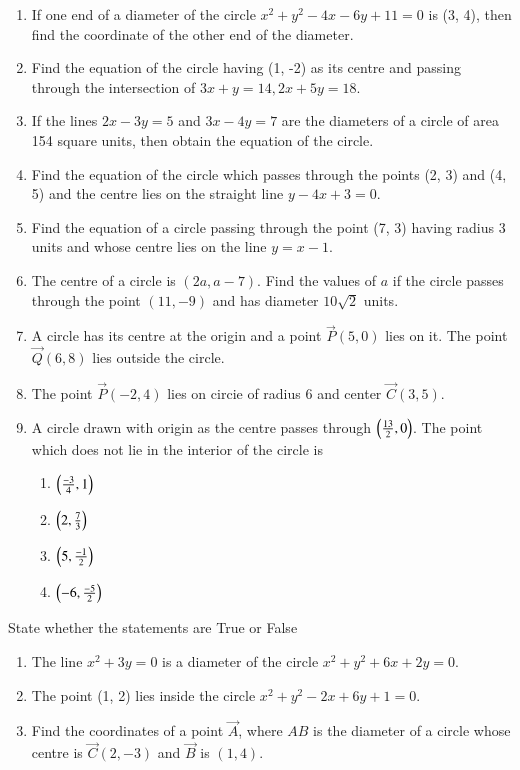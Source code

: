 \begin{enumerate}[label=\thesubsection.\arabic*, ref=\thesubsection.\theenumi, resume*]
 \item If one end of a diameter of the circle $x^2+y^2-4x-6y+11 =0$ is (3, 4),  then find the coordinate of the other end of the diameter.
 \item Find the equation of the circle having (1, -2) as its centre  and passing through the intersection of $3x+y=14,  2x+5y=18$.
\item If the lines $2x-3y=5$ and $3x-4y=7$ are the diameters of a circle of area 154 square units,  then obtain the equation of the circle.
\item Find the equation of the circle which passes through the points (2, 3) and (4, 5) and the centre lies on the straight line $y-4x+3=0$.
\item Find the equation of a circle passing through the point (7, 3) having radius 3 units and whose centre lies on the line $y=x-1$.
\item The centre of a circle is $(2a,  a-7)$. Find the values of $a$ if the circle passes through the point $(11,  -9)$ and has diameter $10\sqrt{2}$ units.
\item A circle has its centre at the origin and a point $\vec{P}(5,  0)$ lies on it. The point $\vec{Q}(6,  8)$ lies outside the circle.
 \item The point $\vec{P}(-2,  4)$ lies on circie of radius 6 and center $\vec{C}(3,  5)$.
\item A circle drawn with origin as the
centre passes through 
		$\left(\frac{13}{2},  0\right)$. The
point which does not lie in the
interior of the circle is
\begin{enumerate}
\item $\left(\frac{-3}{4},  1\right)$
\item $\left(2,  \frac{7}{3}\right)$
\item $\left(5,  \frac{-1}{2}\right)$
\item $\left(-6,  \frac{-5}{2}\right)$
\end{enumerate}
\end{enumerate}
State whether the statements are True or False 
\begin{enumerate}[label=\thesubsection.\arabic*, ref=\thesubsection.\theenumi, resume*]
\item The line $x^2+3y=0$ is a diameter of the circle $x^2+y^2+6x+2y=0$.
\item The point (1, 2) lies inside the circle $x^2+y^2-2x+6y+1=0$.
\item Find the coordinates of a point $\vec{A}$, where $AB$ is the diameter of a circle whose centre is $ \vec{C}(2,-3)$  and  $\vec{B}$ is $(1,4)$.
	\\
		\solution
	
\end{enumerate}
